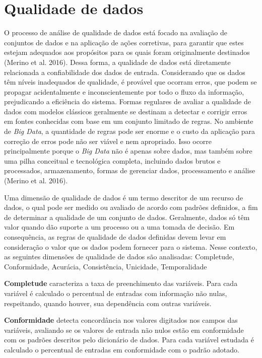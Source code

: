 \documentclass[
  12,
]{proadi}
\author{}
\date{\vspace{-2.5em}}
\begin{document}
\hypertarget{qualidade-de-dados}{%
\section{Qualidade de dados}\label{qualidade-de-dados}}

O processo de análise de qualidade de dados está focado na avaliação de
conjuntos de dados e na aplicação de ações corretivas, para garantir que
estes estejam adequados aos propósitos para os quais foram originalmente
destinados (Merino et al. 2016). Dessa forma, a qualidade de dados está
diretamente relacionada a confiabilidade dos dados de entrada.
Considerando que os dados têm níveis inadequados de qualidade, é
provável que ocorram erros, que podem se propagar acidentalmente e
inconscientemente por todo o fluxo da informação, prejudicando a
eficiência do sistema. Formas regulares de avaliar a qualidade de dados
com modelos clássicos geralmente se destinam a detectar e corrigir erros
em fontes conhecidas com base em um conjunto limitado de regras. No
ambiente de \emph{Big Data}, a quantidade de regras pode ser enorme e o
custo da aplicação para correção de erros pode não ser viável e nem
apropriado. Isso ocorre principalmente porque o \emph{Big Data} não é
apenas sobre dados, mas também sobre uma pilha conceitual e tecnológica
completa, incluindo dados brutos e processados, armazenamento, formas de
gerenciar dados, processamento e análise (Merino et al. 2016).

Uma dimensão de qualidade de dados é um termo descritor de um recurso de
dados, o qual pode ser medido ou avaliado de acordo com padrões
definidos, a fim de determinar a qualidade de um conjunto de dados.
Geralmente, dados só têm valor quando dão suporte a um processo ou a uma
tomada de decisão. Em consequência, as regras de qualidade de dados
definidas devem levar em consideração o valor que os dados podem
fornecer para o sistema. Nesse contexto, as seguintes dimensões de
qualidade de dados são analisadas: Completude, Conformidade, Acurácia,
Consistência, Unicidade, Temporalidade

\textbf{Completude} caracteriza a taxa de preenchimento das variáveis.
Para cada variável é calculado o percentual de entradas com informação
não nulas, respeitando, quando houver, sua dependência com outras
variáveis.

\textbf{Conformidade} detecta concordância nos valores digitados nos
campos das variáveis, avaliando se os valores de entrada não nulos estão
em conformidade com os padrões descritos pelo dicionário de dados. Para
cada variável estudada é calculado o percentual de entradas em
conformidade com o padrão adotado.
\end{document}
